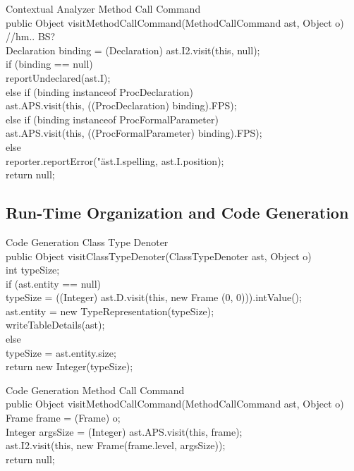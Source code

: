 \documentclass{beamer}
\begin{document}
\begin{frame}{Contextual Analyzer}
\alert{Method Call Command} \\
public Object visitMethodCallCommand(MethodCallCommand ast, Object o) \\
  //hm.. BS?\\
  Declaration binding = (Declaration) ast.I2.visit(this, null);\\
  if (binding == null)\\
    reportUndeclared(ast.I);\\
  else if (binding instanceof ProcDeclaration) \\
    ast.APS.visit(this, ((ProcDeclaration) binding).FPS);\\
   else if (binding instanceof ProcFormalParameter) \\
    ast.APS.visit(this, ((ProcFormalParameter) binding).FPS);\\
   else\\
    reporter.reportError("\"%
                         ast.I.spelling, ast.I.position);\\
  return null;
\end{frame}

\subsection{Run-Time Organization and Code Generation}

\begin{frame}{Code Generation}
\alert{Class Type Denoter} \\
public Object visitClassTypeDenoter(ClassTypeDenoter ast, Object o) \\
  int typeSize;\\
  if (ast.entity == null) \\
    typeSize = ((Integer) ast.D.visit(this, new Frame (0, 0))).intValue();\\
    ast.entity = new TypeRepresentation(typeSize);\\
    writeTableDetails(ast);\\
   else\\
    typeSize = ast.entity.size;\\
  return new Integer(typeSize);
\end{frame}

\begin{frame}{Code Generation}
\alert{Method Call Command} \\
public Object visitMethodCallCommand(MethodCallCommand ast, Object o) \\
  Frame frame = (Frame) o;\\
  Integer argsSize = (Integer) ast.APS.visit(this, frame);\\
  ast.I2.visit(this, new Frame(frame.level, argsSize));\\
  return null;
\end{frame}
\end{document}
